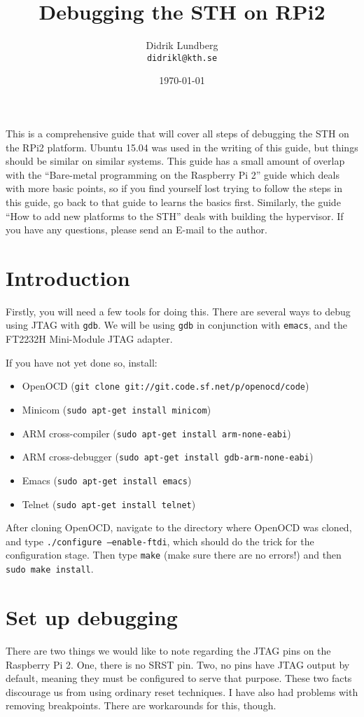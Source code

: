 \documentclass[a4paper,11pt,reqno]{amsart}
\title{Debugging the STH on RPi2}
\author{Didrik Lundberg\\
\texttt{didrikl@kth.se}}
\date{\today}
\begin{document}
\maketitle
\noindent
This is a comprehensive guide that will cover all steps of debugging the STH on the RPi2 platform. Ubuntu 15.04 was used in the writing of this guide, but things should be similar on similar systems. This guide has a small amount of overlap with the ``Bare-metal programming on the Raspberry Pi 2'' guide which deals with more basic points, so if you find yourself lost trying to follow the steps in this guide, go back to that guide to learns the basics first. Similarly, the guide ``How to add new platforms to the STH'' deals with building the hypervisor. If you have any questions, please send an E-mail to the author.

\section{Introduction}
Firstly, you will need a few tools for doing this. There are several ways to debug using JTAG with \texttt{gdb}. We will be using \texttt{gdb} in conjunction with \texttt{emacs}, and the FT2232H Mini-Module JTAG adapter.

If you have not yet done so, install:

\begin{itemize}
\item OpenOCD (\texttt{git clone git://git.code.sf.net/p/openocd/code})
\item Minicom (\texttt{sudo apt-get install minicom})
\item ARM cross-compiler (\texttt{sudo apt-get install arm-none-eabi})
\item ARM cross-debugger (\texttt{sudo apt-get install gdb-arm-none-eabi})
\item Emacs (\texttt{sudo apt-get install emacs})
\item Telnet (\texttt{sudo apt-get install telnet})
\end{itemize}

After cloning OpenOCD, navigate to the directory where OpenOCD was cloned, and type \texttt{./configure --enable-ftdi}, which should do the trick for the configuration stage. Then type \texttt{make} (make sure there are no errors!) and then \texttt{sudo make install}.

\section{Set up debugging}
There are two things we would like to note regarding the JTAG pins on the Raspberry Pi 2. One, there is no SRST pin. Two, no pins have JTAG output by default, meaning they must be configured to serve that purpose. These two facts discourage us from using ordinary reset techniques. I have also had problems with removing breakpoints. There are workarounds for this, though.
\end{document}
